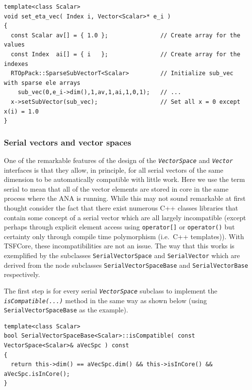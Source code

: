 {\scriptsize\begin{verbatim}
template<class Scalar>
void set_eta_vec( Index i, Vector<Scalar>* e_i )
{
  const Scalar av[] = { 1.0 };               // Create array for the values
  const Index  ai[] = { i   };               // Create array for the indexes
  RTOpPack::SparseSubVectorT<Scalar>         // Initialize sub_vec with sparse ele arrays
    sub_vec(0,e_i->dim(),1,av,1,ai,1,0,1);   // ...
  x->setSubVector(sub_vec);                  // Set all x = 0 except x(i) = 1.0
}
\end{verbatim}}

%
\subsubsection{Serial vectors and vector spaces}
\label{tsfcore:sec:serial_vecs}
%

One of the remarkable features of the design of the
{}\texttt{\textit{VectorSpace}} and {}\texttt{\textit{Vector}}
interfaces is that they allow, in principle, for all serial vectors of
the same dimension to be automatically compatible with little work.
Here we use the term serial to mean that all of the vector elements
are stored in core in the same process where the ANA is running.
While this may not sound remarkable at first thought consider the fact
that there exist numerous C++ classes libraries that contain some
concept of a serial vector {}\cite{ref:lumsdaine_and_siek_1998,
ref:tnt, ref:roberts_et_al_1996, ref:math++_1996} which are all
largely incompatible (except perhaps through explicit element access
using {}\texttt{operator[]} or {}\texttt{operator()} but certainty
only through compile time polymorphism (i.e.~C++ templates)).  With
TSFCore, these incompatibilities are not an issue.  The way that this
works is exemplified by the subclasses {}\texttt{SerialVectorSpace}
and {}\texttt{SerialVector} which are derived from the node subclasses
{}\texttt{Serial\-VectorSpace\-Base} and {}\texttt{SerialVectorBase}
respectively.

The first step is for every serial {}\texttt{\textit{VectorSpace}}
subclass to implement the {}\texttt{\textit{isCompatible(\-...)}}
method in the same way as shown below (using
{}\texttt{SerialVectorSpaceBase} as the example).

{\scriptsize\begin{verbatim}
template<class Scalar>
bool SerialVectorSpaceBase<Scalar>::isCompatible( const VectorSpace<Scalar>& aVecSpc ) const
{
  return this->dim() == aVecSpc.dim() && this->isInCore() && aVecSpc.isInCore();
}
\end{verbatim}}

